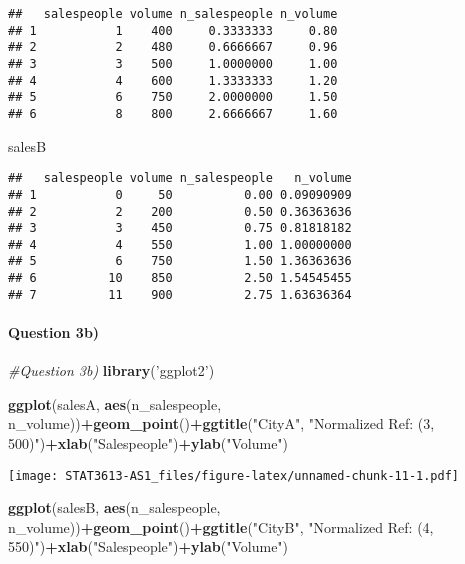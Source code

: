 \documentclass[]{article}
\newenvironment{Shaded}{\begin{snugshade}}{\end{snugshade}}
\newcommand{\CommentTok}[1]{\textcolor[rgb]{0.56,0.35,0.01}{\textit{#1}}}
\newcommand{\KeywordTok}[1]{\textcolor[rgb]{0.13,0.29,0.53}{\textbf{#1}}}
\newcommand{\NormalTok}[1]{#1}
\newcommand{\OperatorTok}[1]{\textcolor[rgb]{0.81,0.36,0.00}{\textbf{#1}}}
\newcommand{\StringTok}[1]{\textcolor[rgb]{0.31,0.60,0.02}{#1}}
\let\oldparagraph\paragraph
\renewcommand{\paragraph}[1]{\oldparagraph{#1}\mbox{}}
\begin{document}
\begin{verbatim}
##   salespeople volume n_salespeople n_volume
## 1           1    400     0.3333333     0.80
## 2           2    480     0.6666667     0.96
## 3           3    500     1.0000000     1.00
## 4           4    600     1.3333333     1.20
## 5           6    750     2.0000000     1.50
## 6           8    800     2.6666667     1.60
\end{verbatim}

\begin{Shaded}
\begin{Highlighting}[]
\NormalTok{salesB}
\end{Highlighting}
\end{Shaded}

\begin{verbatim}
##   salespeople volume n_salespeople   n_volume
## 1           0     50          0.00 0.09090909
## 2           2    200          0.50 0.36363636
## 3           3    450          0.75 0.81818182
## 4           4    550          1.00 1.00000000
## 5           6    750          1.50 1.36363636
## 6          10    850          2.50 1.54545455
## 7          11    900          2.75 1.63636364
\end{verbatim}

\hypertarget{question-3b}{%
\paragraph{Question 3b)}\label{question-3b}}

\begin{Shaded}
\begin{Highlighting}[]
\CommentTok{#Question 3b)}
\KeywordTok{library}\NormalTok{(}\StringTok{'ggplot2'}\NormalTok{)}

\KeywordTok{ggplot}\NormalTok{(salesA, }\KeywordTok{aes}\NormalTok{(n_salespeople, n_volume))}\OperatorTok{+}\KeywordTok{geom_point}\NormalTok{()}\OperatorTok{+}\KeywordTok{ggtitle}\NormalTok{(}\StringTok{"CityA"}\NormalTok{, }\StringTok{"Normalized Ref: (3, 500)"}\NormalTok{)}\OperatorTok{+}\KeywordTok{xlab}\NormalTok{(}\StringTok{"Salespeople"}\NormalTok{)}\OperatorTok{+}\KeywordTok{ylab}\NormalTok{(}\StringTok{"Volume"}\NormalTok{)}
\end{Highlighting}
\end{Shaded}

\texttt{[image: STAT3613-AS1\_files/figure-latex/unnamed-chunk-11-1.pdf]}

\begin{Shaded}
\begin{Highlighting}[]
\KeywordTok{ggplot}\NormalTok{(salesB, }\KeywordTok{aes}\NormalTok{(n_salespeople, n_volume))}\OperatorTok{+}\KeywordTok{geom_point}\NormalTok{()}\OperatorTok{+}\KeywordTok{ggtitle}\NormalTok{(}\StringTok{"CityB"}\NormalTok{, }\StringTok{"Normalized Ref: (4, 550)"}\NormalTok{)}\OperatorTok{+}\KeywordTok{xlab}\NormalTok{(}\StringTok{"Salespeople"}\NormalTok{)}\OperatorTok{+}\KeywordTok{ylab}\NormalTok{(}\StringTok{"Volume"}\NormalTok{)}
\end{Highlighting}
\end{Shaded}
\end{document}
